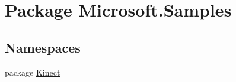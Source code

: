 \hypertarget{namespace_microsoft_1_1_samples}{\section{Package Microsoft.\-Samples}
\label{namespace_microsoft_1_1_samples}
}
\subsection*{Namespaces}
\begin{DoxyCompactItemize}
\item 
package \hyperlink{namespace_microsoft_1_1_samples_1_1_kinect}{Kinect}
\end{DoxyCompactItemize}
